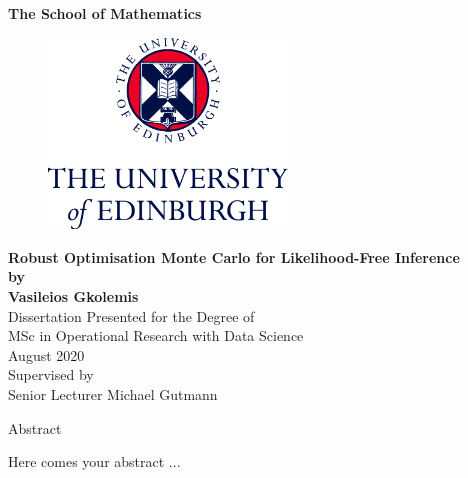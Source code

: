 \documentclass[11pt,twoside]{article}
\numberwithin{Theorem}{section}
\numberwithin{Definition}{section}
\numberwithin{Lemma}{section}
\numberwithin{Algorithm}{section}
\numberwithin{equation}{section}
\begin{document}
\pagestyle{empty}

\begin{titlepage}
\vspace*{.5em}
\center
\textbf{\large{The School of Mathematics}} \\
\vspace*{1em}
\begin{figure}[!h]
\centering
\includegraphics[width=180pt]{CentredLogoCMYK.jpg}
\end{figure}
\vspace{2em}
\textbf{\Huge{Robust Optimisation Monte Carlo for Likelihood-Free Inference}}\\[2em]
\textbf{\LARGE{by}}\\
\vspace{2em}
\textbf{\LARGE{Vasileios Gkolemis}}\\
\vspace{6.5em}
\Large{Dissertation Presented for the Degree of\\
MSc in Operational Research with Data Science}\\
\vspace{6.5em}
\Large{August 2020}\\
\vspace{3em}
\Large{Supervised by\\Senior Lecturer Michael Gutmann}
\vfill
\end{titlepage}

\cleardoublepage

\begin{center}
\Large{Abstract}
\end{center}

Here comes your abstract ...
\end{document}
